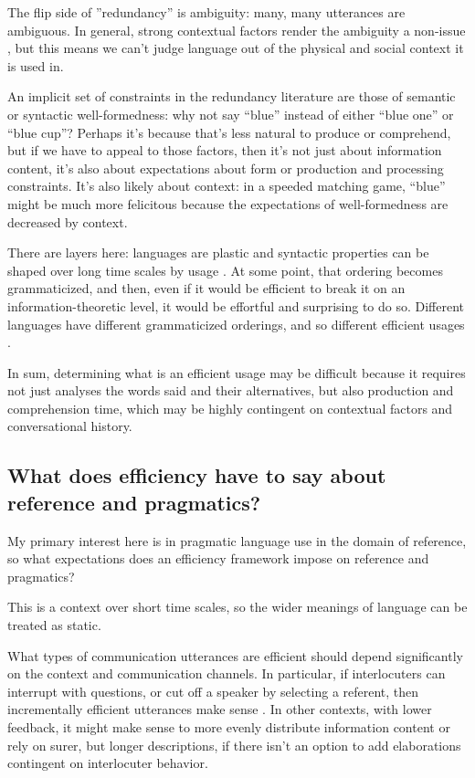 \documentclass[]{article}
\begin{document}
The flip side of ''redundancy'' is ambiguity: many, many utterances are ambiguous. In general, strong contextual factors render the ambiguity a non-issue \cite{piantadosi2012}, but this means we can't judge language out of the physical and social context it is used in. 

An implicit set of constraints in the redundancy literature are those of semantic or syntactic well-formedness: why not say ``blue'' instead of either ``blue one'' or ``blue cup''? Perhaps it's because that's less natural to produce or comprehend, but if we have to appeal to those factors, then it's not just about information content, it's also about expectations about form or production and processing constraints. It's also likely about context: in a speeded matching game, ``blue'' might be much more felicitous because the expectations of well-formedness are decreased by context. 

There are layers here: languages are plastic and syntactic properties can be shaped over long time scales by usage \cite{hawkins1995}. At some point, that ordering becomes grammaticized, and then, even if it would be efficient to break it on an information-theoretic level, it would be effortful and surprising to do so. Different languages have different grammaticized orderings, and so different efficient usages \cite{rubio-fernandez2021}. 

In sum, determining what is an efficient usage may be difficult because it requires not just analyses the words said and their alternatives, but also production and comprehension time, which may be highly contingent on contextual factors and conversational history. 

\subsection{What does efficiency have to say about reference and pragmatics?}

My primary interest here is in pragmatic language use in the domain of reference, so what expectations does an efficiency framework impose on reference and pragmatics? 

This is a context over short time scales, so the wider meanings of language can be treated as static. 

What types of communication utterances are efficient should depend significantly on the context and communication channels. In particular, if interlocuters can interrupt with questions, or cut off a speaker by selecting a referent, then incrementally efficient utterances make sense \cite{gibson2019}. In other contexts, with lower feedback, it might make sense to more evenly distribute information content or rely on surer, but longer descriptions, if there isn't an option to add elaborations contingent on interlocuter behavior. 
\end{document}
